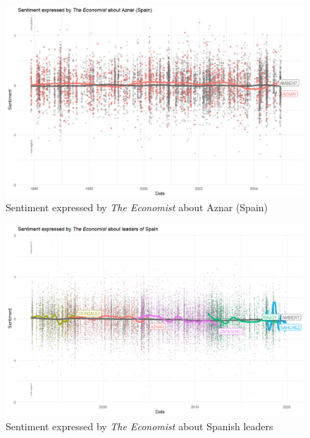 \documentclass[11pt, letterpaper, twoside]{article}
\begin{document}
\begin{figure} %
    \caption{Sentiment expressed by \textit{The Economist} about Aznar (Spain)}
    \centering
    \includegraphics[clip, width=\textwidth]{figures/aznarA29-4231_leader_figure.png}
\end{figure}

\begin{figure} %
    \caption{Sentiment expressed by \textit{The Economist} about Spanish leaders}
    \centering
    \includegraphics[clip, width=\textwidth]{figures/230_timeline_fig.png}
\end{figure}
\end{document}
